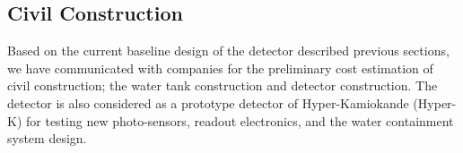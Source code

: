 \subsection{Civil Construction}\label{sec:civil}


Based on the current baseline design of the \nuprism detector described previous sections,
we have communicated with companies for the preliminary cost estimation of
\nuprism civil construction; the water tank construction and detector construction.
The \nuprism detector is also considered as a prototype detector of Hyper-Kamiokande (Hyper-K) for
testing new photo-sensors, readout electronics, and the water containment system design.
